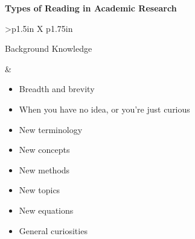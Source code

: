 \documentclass[8pt]{extarticle}
\begin{document}
\centering

{
\Large\bfseries Types of Reading in Academic Research\par
}


\begin{tabularx}{\linewidth}{>{\bfseries}p{1.5in} X p{1.75in}}
    \toprule

    \begin{minipage}[t]{\linewidth}
        \vspace{0pt}
        Background Knowledge
    \end{minipage}

            &   \begin{minipage}[t]{\linewidth}
                    \vspace{0pt}

                    \begin{whatBox}
                    \begin{itemize}[nosep,leftmargin=*]
                        \item Breadth and brevity
                        \item When you have no idea, or you're just curious
                    \end{itemize}
                    \end{whatBox}

                    \begin{whenBox}
                    \begin{multicols}{2}
                    \begin{itemize}[nosep,leftmargin=*]
                        \item New terminology
                        \item New concepts
                        \item New methods
                        \item New topics
                        \item New equations
                        \item General curiosities
                    \end{itemize}
                    \end{multicols}
                    \end{whenBox}
                \end{minipage}
            

\end{tabularx}
\end{document}
